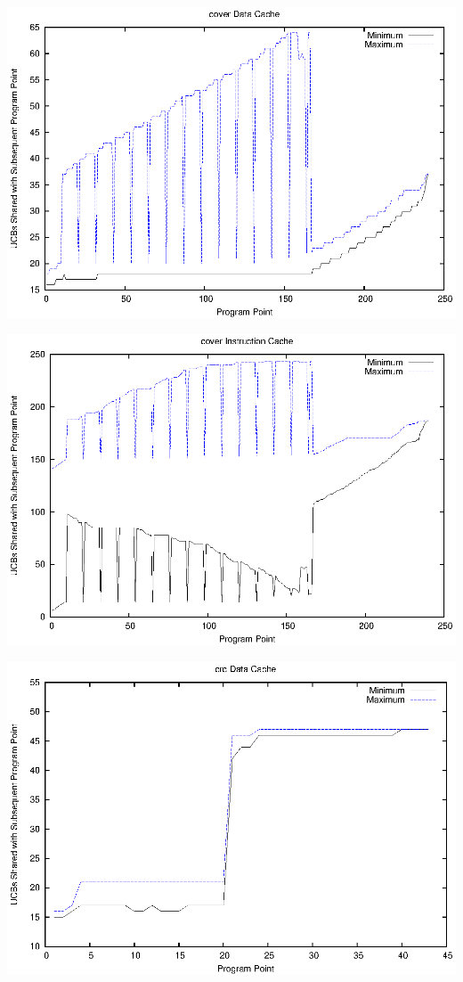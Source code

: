 \begin{center}
  \includegraphics[width=\linewidth]{eps/cover-dcache.eps}
\end{center}

\begin{center}
  \includegraphics[width=\linewidth]{eps/cover-icache.eps}
\end{center}

\begin{center}
  \includegraphics[width=\linewidth]{eps/crc-dcache.eps}
\end{center}

